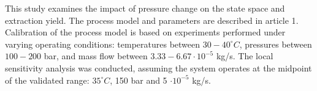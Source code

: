 \documentclass[../Article_Sensitivity_Analsysis.tex]{subfiles}
\begin{document}
	
	\label{CH: Results}
	
	
	This study examines the impact of pressure change on the state space and extraction yield. The process model and parameters are described in {\color{red}article 1}. Calibration of the process model is based on experiments performed under varying operating conditions: temperatures between $30 - 40^\circ C$, pressures between $100 - 200$ bar, and mass flow between $3.33-6.67 \cdot 10^{-5}$ kg/s. The local sensitivity analysis was conducted, assuming the system operates at the midpoint of the validated range: $35^\circ C$, 150 bar and 5 $\cdot 10^{-5}$ kg/s.
	
        
    
    
	
\end{document}
